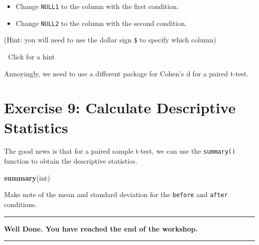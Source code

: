 \documentclass[
]{book}
\newenvironment{Shaded}{\begin{snugshade}}{\end{snugshade}}
\newcommand{\AttributeTok}[1]{\textcolor[rgb]{0.13,0.29,0.53}{#1}}
\newcommand{\CommentTok}[1]{\textcolor[rgb]{0.56,0.35,0.01}{\textit{#1}}}
\newcommand{\ConstantTok}[1]{\textcolor[rgb]{0.56,0.35,0.01}{#1}}
\newcommand{\FunctionTok}[1]{\textcolor[rgb]{0.13,0.29,0.53}{\textbf{#1}}}
\newcommand{\NormalTok}[1]{#1}
\newcommand{\SpecialCharTok}[1]{\textcolor[rgb]{0.81,0.36,0.00}{\textbf{#1}}}
\newcommand{\StringTok}[1]{\textcolor[rgb]{0.31,0.60,0.02}{#1}}
\let\oldsection\section
\renewcommand{\section}{\needspace{5\baselineskip}\oldsection}
\begin{document}
\begin{itemize}
\item
  Change \texttt{NULL1} to the column with the first condition.
\item
  Change \texttt{NULL2} to the column with the second condition.
\end{itemize}

(Hint: you will need to use the dollar sign \texttt{\$} to specify which column)

👀 Click for a hint

\begin{Shaded}
\end{Shaded}

Annoyingly, we need to use a different package for Cohen's d for a paired t-test.

\begin{Shaded}
\end{Shaded}

\section{Exercise 9: Calculate Descriptive Statistics}\label{exercise-9-calculate-descriptive-statistics}

The good news is that for a paired sample t-test, we can use the \texttt{summary()} function to obtain the descriptive statistics.

\begin{Shaded}
\begin{Highlighting}[]
\FunctionTok{summary}\NormalTok{(int)}
\end{Highlighting}
\end{Shaded}

Make note of the mean and standard deviation for the \texttt{before} and \texttt{after} conditions.

\begin{center}\rule{0.5\linewidth}{0.5pt}\end{center}

\textbf{Well Done. You have reached the end of the workshop.}

\begin{center}\rule{0.5\linewidth}{0.5pt}\end{center}

  
\end{document}
